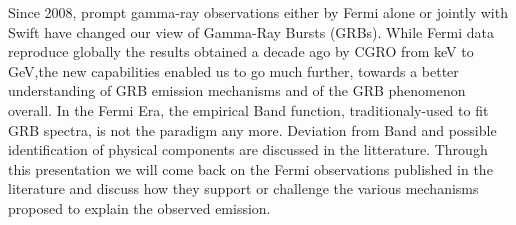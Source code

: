 


\bigskip



\bigskip

\noindent Since 2008, prompt gamma-ray observations either by Fermi alone or jointly with Swift have changed our view of Gamma-Ray Bursts (GRBs). While Fermi data reproduce globally the results obtained a decade ago by CGRO from keV to GeV,the new capabilities enabled us to go much further, towards a better understanding of GRB emission mechanisms and of the GRB phenomenon overall.
In the Fermi Era, the empirical Band function, traditionaly-used to fit GRB spectra, is not the paradigm any more. Deviation from Band and possible identification of physical components are discussed in the litterature.
Through this presentation we will come back on the Fermi observations published in the literature and discuss how they support or challenge the various mechanisms proposed to explain the observed emission.
